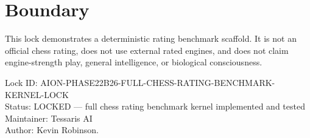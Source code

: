 \documentclass[11pt,a4paper]{article}
\begin{document}
\section{Boundary}

This lock demonstrates a deterministic rating benchmark scaffold. It is not an official chess rating, does not use external rated engines, and does not claim engine-strength play, general intelligence, or biological consciousness.

\bigskip

\noindent
Lock ID: AION-PHASE22B26-FULL-CHESS-RATING-BENCHMARK-KERNEL-LOCK\\
Status: LOCKED --- full chess rating benchmark kernel implemented and tested\\
Maintainer: Tessaris AI\\
Author: Kevin Robinson.
\end{document}
